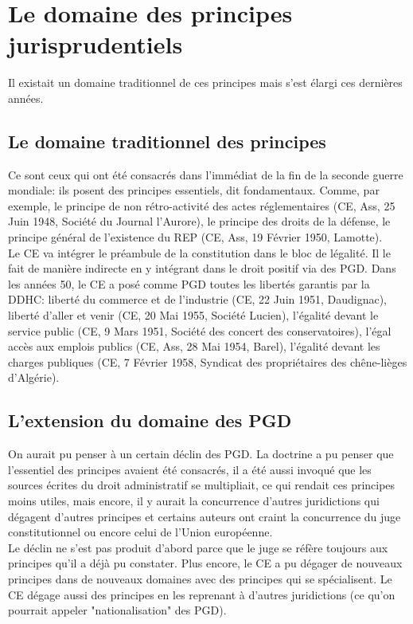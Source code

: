 \documentclass[10pt, a4paper, openany]{book}
\begin{document}
\section{Le domaine des principes jurisprudentiels}

Il existait un domaine traditionnel de ces principes mais s'est élargi ces dernières années. 

\subsection{Le domaine traditionnel des principes}

Ce sont ceux qui ont été consacrés dans l'immédiat de la fin de la seconde guerre mondiale: ils posent des principes essentiels, dit fondamentaux. Comme, par exemple, le principe de non rétro-activité des actes réglementaires (CE, Ass, 25 Juin 1948, Société du Journal l'Aurore), le principe des droits de la défense, le principe général de l'existence du REP (CE, Ass, 19 Février 1950, Lamotte). \\
Le CE va intégrer le préambule de la constitution dans le bloc de légalité. Il le fait de manière indirecte en y intégrant dans le droit positif via des PGD. Dans les années 50, le CE a posé comme PGD toutes les  libertés garantis par la DDHC: liberté du commerce et de l'industrie (CE, 22 Juin 1951, Daudignac), liberté d'aller et venir (CE, 20 Mai 1955, Société Lucien), l'égalité devant le service public (CE, 9 Mars 1951, Société des concert des conservatoires), l'égal accès aux emplois publics (CE, Ass, 28 Mai 1954, Barel), l'égalité devant les charges publiques (CE, 7 Février 1958, Syndicat des propriétaires des chêne-lièges d'Algérie).  

\subsection{L'extension du domaine des PGD}

On aurait pu penser à un certain déclin des PGD. La doctrine a pu penser que l'essentiel des principes avaient été consacrés, il a été aussi invoqué que les sources écrites du droit administratif se multipliait, ce qui rendait ces principes moins utiles, mais encore, il y aurait la concurrence d'autres juridictions qui dégagent d'autres principes et certains auteurs ont craint la concurrence du juge constitutionnel ou encore celui de l'Union européenne. \\
Le déclin ne s'est pas produit d'abord parce que le juge se réfère toujours aux principes qu'il a déjà pu constater. Plus encore, le CE a pu dégager de nouveaux principes dans de nouveaux domaines avec des principes qui se spécialisent. Le CE dégage aussi des principes en les reprenant à d'autres juridictions (ce qu'on pourrait appeler "nationalisation" des PGD). 
\end{document}
